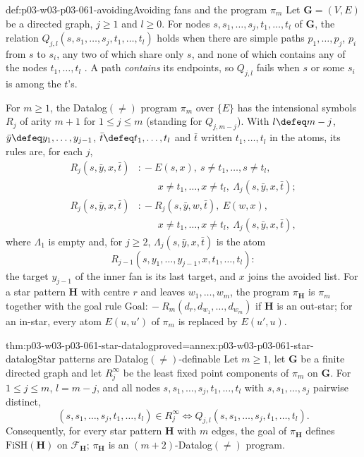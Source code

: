 \begin{hbdefinition}{def:p03-w03-p03-061-avoiding}{Avoiding fans and the program \(\pi_m\)}
Let \(\mathbf G=(V,E)\) be a directed graph, \(j\ge1\) and \(l\ge0\). For
nodes \(s,s_1,\ldots,s_j,t_1,\ldots,t_l\) of \(\mathbf G\), the relation
\(Q_{j,l}(s,s_1,\ldots,s_j,t_1,\ldots,t_l)\) holds when there are simple
paths \(p_1,\ldots,p_j\), \(p_i\) from \(s\) to \(s_i\), any two of which
share only \(s\), and none of which contains any of the nodes
\(t_1,\ldots,t_l\) \cite[pp.~24--25]{KolaitisVardi1995DatalogManuscript}.
A path \emph{contains} its endpoints, so \(Q_{j,l}\) fails when \(s\) or
some \(s_i\) is among the \(t\)'s.

For \(m\ge1\), the Datalog\((\neq)\) program \(\pi_m\) over \(\{E\}\) has the
intensional symbols \(R_j\) of arity \(m+1\) for \(1\le j\le m\) (standing
for \(Q_{j,m-j}\)). With \(l\defeq m-j\), \(\bar y\defeq y_1,\ldots,y_{j-1}\),
\(\bar t\defeq t_1,\ldots,t_l\) and \(\bar t\) written \(t_1,\ldots,t_l\) in
the atoms, its rules are, for each \(j\),
\[
\begin{aligned}
 R_j(s,\bar y,x,\bar t)&\mathrel{{:}\!-}E(s,x),\ s\neq t_1,\ldots,s\neq t_l,\\
 &\qquad x\neq t_1,\ldots,x\neq t_l,\ \Lambda_j(s,\bar y,x,\bar t);\\
 R_j(s,\bar y,x,\bar t)&\mathrel{{:}\!-}R_j(s,\bar y,w,\bar t),\ E(w,x),\\
 &\qquad x\neq t_1,\ldots,x\neq t_l,\ \Lambda_j(s,\bar y,x,\bar t),
\end{aligned}
\]
where \(\Lambda_1\) is empty and, for \(j\ge2\),
\(\Lambda_j(s,\bar y,x,\bar t)\) is the atom
\[
 R_{j-1}(s,y_1,\ldots,y_{j-1},x,t_1,\ldots,t_l):
\]
the target \(y_{j-1}\)
of the inner fan is its last target, and \(x\) joins the avoided list. For a
star pattern \(\mathbf H\) with centre \(r\) and leaves \(w_1,\ldots,w_m\),
the program \(\pi_{\mathbf H}\) is \(\pi_m\) together with the goal rule
\(\mathrm{Goal}\mathrel{{:}\!-}R_m(d_r,d_{w_1},\ldots,d_{w_m})\) if
\(\mathbf H\) is an out-star; for an in-star, every atom \(E(u,u')\) of
\(\pi_m\) is replaced by \(E(u',u)\).
\end{hbdefinition}

\begin{hbtheorem}{thm:p03-w03-p03-061-star-datalog}{proved=annex:p03-w03-p03-061-star-datalog}{Star patterns are Datalog\((\neq)\)-definable}
Let \(m\ge1\), let \(\mathbf G\) be a finite directed graph and let
\(R_j^\infty\) be the least fixed point components of \(\pi_m\) on
\(\mathbf G\). For \(1\le j\le m\), \(l=m-j\), and all nodes
\(s,s_1,\ldots,s_j,t_1,\ldots,t_l\) with \(s,s_1,\ldots,s_j\) pairwise
distinct,
\[
 (s,s_1,\ldots,s_j,t_1,\ldots,t_l)\in R_j^\infty
 \iff Q_{j,l}(s,s_1,\ldots,s_j,t_1,\ldots,t_l).
\]
Consequently, for every star pattern \(\mathbf H\) with \(m\) edges, the
goal of \(\pi_{\mathbf H}\) defines \(\mathrm{FiSH}(\mathbf H)\) on
\(\mathcal F_{\mathbf H}\); \(\pi_{\mathbf H}\) is an
\((m+2)\)-Datalog\((\neq)\) program.
\end{hbtheorem}

